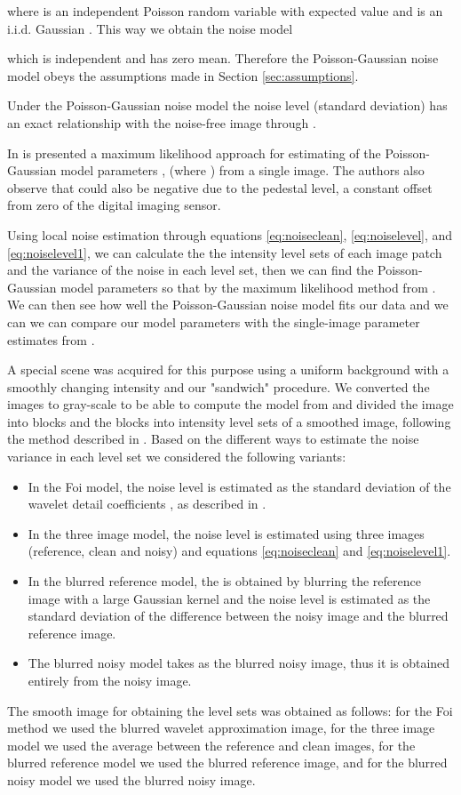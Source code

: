 \documentclass[review]{elsarticle}
\begin{document}
where  is an independent Poisson random variable with expected value  and  is an i.i.d. Gaussian . This way we obtain the noise model

which is independent and has zero mean. Therefore the Poisson-Gaussian noise model obeys the assumptions made in Section \ref{sec:assumptions}. 

Under the Poisson-Gaussian noise model the noise level (standard deviation) has an exact relationship with the noise-free image through  .

In \cite{Foi-Poisson} is presented a maximum likelihood approach for estimating of the Poisson-Gaussian model parameters , (where ) from a single image. The authors also observe that  could also be negative due to the pedestal level, a constant offset from zero of the digital imaging sensor.

Using local noise estimation through equations \eqref{eq:noiseclean}, \eqref{eq:noiselevel}, and \eqref{eq:noiselevel1}, we can calculate the the intensity level sets  of each image patch and the variance  of the noise in each level set, then we can find the Poisson-Gaussian model parameters  so that  by the maximum likelihood method from \cite{Foi-Poisson}. We can then see how well the Poisson-Gaussian noise model fits our data and we can we can compare our model parameters with the single-image parameter estimates from \cite{Foi-Poisson}.

A special scene was acquired for this purpose using a uniform background with a smoothly changing intensity and our "sandwich" procedure. We converted the images to gray-scale to be able to compute the model from \cite{Foi-Poisson} and divided the image into  blocks and the blocks into intensity level sets of a smoothed image, following the method described in \cite{Foi-Poisson}. Based on the different ways to estimate the noise variance  in each level set 
we considered the following variants:
\begin{itemize}
\item In the Foi model, the noise level  is estimated as the standard deviation of the wavelet detail coefficients , as described in \cite{Foi-Poisson}.
\item In the three image model, the noise level  is estimated using three images (reference, clean and noisy) and equations \eqref{eq:noiseclean} and \eqref{eq:noiselevel1}. 
\item In the blurred reference model, the  is obtained by blurring the reference image with a large Gaussian kernel and the noise level  is estimated as the standard deviation of the difference between the noisy image and the blurred reference image. 
\item The blurred noisy model takes as  the blurred noisy image, thus it is obtained entirely from the noisy image.
\end{itemize}
The smooth image for obtaining the level sets was obtained as follows: for the Foi method we used the blurred  wavelet approximation image, for the three image model we used the average  between the reference and clean images, for the blurred reference model we used the blurred reference image, and for the blurred noisy model we used the blurred noisy image.
\end{document}
